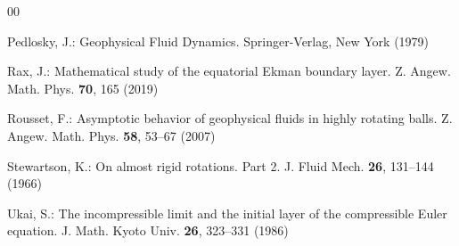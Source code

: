 \documentclass[pdflatex,sn-mathphys-num]{sn-jnl}%
\theoremstyle{thmstyleone}%
\theoremstyle{thmstyletwo}%
\theoremstyle{thmstylethree}%
\theoremstyle{thmstyletwo}
\begin{document}
\begin{thebibliography}{00}
	
	
	Pedlosky, J.: Geophysical Fluid Dynamics.
	{Springer}-{Verlag}, New {York} (1979) 
	
	
	
	Rax, J.:  Mathematical study of the equatorial Ekman boundary layer. {Z. Angew. Math. Phys.} {\bf 70},  165  (2019)
	
Rousset, F.: Asymptotic behavior of geophysical fluids in highly rotating balls.
Z. Angew. Math. Phys. \textbf{58}, 53--67 (2007) 


Stewartson, K.: On almost rigid rotations. Part 2.
J. Fluid Mech. \textbf{26}, 131--144 (1966)   
	
Ukai, S.: The incompressible limit and the initial layer of the compressible Euler equation.
J. Math. Kyoto Univ. \textbf{26}, 323--331 (1986)  
 
\end{thebibliography}
\end{document}
